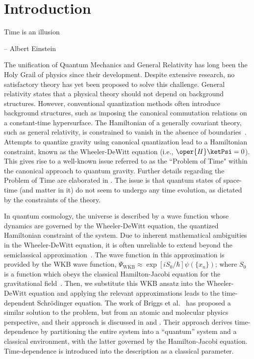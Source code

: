 \chapter{Introduction\label{chap:introduction}}

\epigraph{ \myopeningquote Time is an illusion \myclosingquote}{-- Albert Einstein}

The unification of Quantum Mechanics and General Relativity has long been the Holy Grail of physics 
since their development. Despite extensive research, no satisfactory theory has yet been proposed 
to solve this challenge. General relativity states that a physical theory should not depend on 
background structures. However, conventional quantization methods often introduce background structures, 
such as imposing the canonical commutation relations on a constant-time hypersurface. The Hamiltonian 
of a generally covariant theory, such as general relativity, is constrained to vanish in the absence 
of boundaries~\cite{gielen2023quantum}. Attempts to quantize gravity using canonical quantization 
lead to a Hamiltonian constraint, known as the Wheeler-DeWitt equation (i.e., \(\oper{H} \ketPsi = 0\)). 
This gives rise to a well-known issue referred to as the ``Problem of Time" within the canonical 
approach to quantum gravity. Further details regarding the Problem of Time are elaborated in 
. The issue is that quantum 
states of space-time (and matter in it) do not seem to undergo any time evolution, as dictated by 
the constraints of the theory.

In quantum cosmology, the universe is described by a wave function whose dynamics are governed 
by the Wheeler-DeWitt equation, the quantized Hamiltonian constraint of the system. Due to inherent 
mathematical ambiguities in the Wheeler-DeWitt equation, it is often unreliable to extend beyond the 
semiclassical approximation~\cite{cooke2010qcintro}. The wave function in this approximation is provided 
by the WKB wave function, \(\Psi_{\mathrm{WKB}} 
\approx \exp\left[iS_0/\hbar\right]\psi(\{x_n\})\); where \(S_0\) is a function which obeys the classical 
Hamilton-Jacobi equation for the gravitational field~\cite{gielen2023quantum}. Then, we substitute this 
WKB ansatz into the Wheeler-DeWitt equation and applying the relevant approximations leads to the 
time-dependent Schr\"odinger equation. The work of Briggs et al.~\cite{briggs2001derivation} 
has proposed a similar solution to the problem, but from an atomic and molecular physics perspective, 
and their approach is discussed in  and .
Their approach derives time-dependence by partitioning the entire system into a ``quantum'' system and a classical 
environment, with the latter governed by the Hamilton-Jacobi equation. Time-dependence is introduced into the 
description as a classical parameter.

